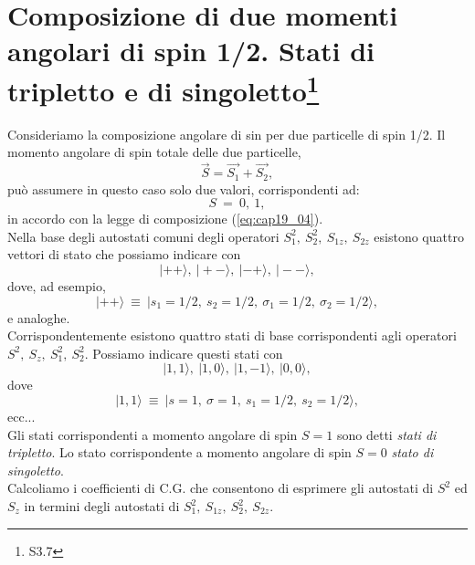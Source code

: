 \section[Composizione di due momenti angolari di spin 1/2. Stati di tripletto e di singoletto]{Composizione di due momenti angolari di spin 1/2. Stati di tripletto e di singoletto\footnote{S3.7}}
Consideriamo la composizione angolare di sin per due particelle di spin 1/2. Il momento angolare di spin totale delle due particelle,
\begin{equation}
\vec{S} = \vec{S_1} + \vec{S_2} ,
\end{equation}
può assumere in questo caso solo due valori, corrispondenti ad:
\begin{equation}
S~= ~0, ~1 ,
\end{equation}
in accordo con la legge di composizione (\ref{eq:cap19_04}).\\
Nella base degli autostati comuni degli operatori $S_1^2 ,~ S_2^2, ~ S_{1z}, ~ S_{2z}$ esistono quattro vettori di stato che possiamo indicare con \\ 
\begin{equation}
|++\rangle ,~ |+-\rangle,~ |-+\rangle , ~|--\rangle  ,
\end{equation}
dove, ad esempio, \\
\begin{equation}
|++\rangle~ \equiv ~|s_1=1/2, ~s_2=1/2,~\sigma_1 = 1/2, ~\sigma_2 = 1/2\rangle ,
\end{equation}
e analoghe. \\
Corrispondentemente esistono quattro stati di base corrispondenti agli operatori $S^2 ,~ S_z, ~ S_1^2, ~ S_2^2$. Possiamo indicare questi stati con \\
\begin{equation}
|1,1\rangle, ~|1,0\rangle, ~|1,-1\rangle, ~|0,0\rangle ,
\end{equation}dove \\
\begin{equation}
|1,1\rangle ~\equiv~ |s=1, ~ \sigma=1, ~s_1=1/2, ~s_2=1/2\rangle ,
\end{equation}
ecc... \\
Gli stati corrispondenti a momento angolare di spin $S=1$ sono detti \emph{stati di tripletto}. Lo stato corrispondente a momento angolare di spin $S=0$ \emph{stato di singoletto}. \\
Calcoliamo i coefficienti di C.G. che consentono di esprimere gli autostati di $S^2$ ed $S_z$ in termini degli autostati di $S_1^2 ,~ S_{1z}, ~ S_2^2, ~ S_{2z}$. \\
